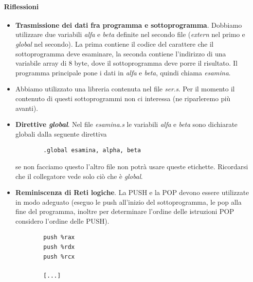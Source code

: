 \paragraph{Riflessioni}
\begin{itemize}
	\item \textbf{Trasmissione dei dati fra programma e sottoprogramma}. Dobbiamo utilizzare due variabili \emph{alfa} e \emph{beta} definite nel secondo file (\emph{extern} nel primo e \emph{global} nel secondo). La prima contiene il codice del carattere che il sottoprogramma deve esaminare, la seconda contiene l'indirizzo di una variabile array di 8 byte, dove il sottoprogramma deve porre il risultato. Il programma principale pone i dati in \emph{alfa} e \emph{beta}, quindi chiama \emph{esamina}.
	\item Abbiamo utilizzato una libreria contenuta nel file \emph{ser.s}. Per il momento il contenuto di questi sottoprogrammi non ci interessa (ne riparleremo più avanti).
	\item \textbf{Direttive \emph{global}}. Nel file \emph{esamina.s} le variabili \emph{alfa} e \emph{beta} sono dichiarate globali dalla seguente direttiva
	\begin{verbatim}
		.global esamina, alpha, beta
	\end{verbatim}
	se non facciamo questo l'altro file non potrà usare queste etichette. Ricordarsi che il collegatore vede solo ciò che è \emph{global}.
	\item \textbf{Reminiscenza di Reti logiche}. La PUSH e la POP devono essere utilizzate in modo adeguato (eseguo le push all'inizio del sottoprogramma, le pop alla fine del programma, inoltre per determinare l'ordine delle istruzioni POP considero l'ordine delle PUSH).
	\begin{verbatim}
		push %rax
		push %rdx
		push %rcx
		
		[...]
		

\end{verbatim}
\end{itemize}
